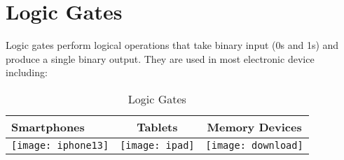 \documentclass{article}
\begin{document}
	\section{Logic Gates}
	Logic gates perform logical operations that take binary input (0s and 1s) and produce a single binary output. They are used in most electronic device including:
	\begin{table}[h!]
		\begin{center}
			\caption{Logic Gates}
			\label{tab:table1}
			\begin{tabular}{l|c|c|}
			\hline
			Smartphones
			&
			Tablets
			&
			Memory Devices
			\\
			\hline
			\texttt{[image: iphone13]}
			&
			\texttt{[image: ipad]}
			&
			\texttt{[image: download]}
			\\
		    \hline
			\end{tabular}
		\end{center}
	\end{table}
\end{document}
